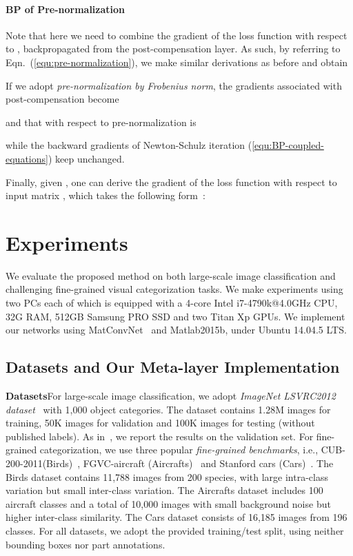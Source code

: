\documentclass[10pt,twocolumn,letterpaper]{article}
\begin{document}
\paragraph{BP of Pre-normalization} Note that here we need to combine the gradient of the loss function  with respect to , backpropagated from the post-compensation layer. As such, by referring to Eqn.~(\ref{equ:pre-normalization}), we make similar derivations as before and obtain 


If we adopt \textit{pre-normalization by Frobenius norm}, the gradients associated with post-compensation  become

and that with respect to  pre-normalization  is

while the backward gradients of Newton-Schulz iteration (\ref{equ:BP-coupled-equations}) keep unchanged.

Finally, given , one can derive the gradient of the loss function  with respect to  input matrix , which takes the following form~\cite{Li_2017_ICCV}:




\section{Experiments}\label{section:experiments}

We  evaluate the proposed method on both large-scale image classification and challenging fine-grained visual categorization  tasks. We make experiments using two PCs each of which is equipped with a 4-core Intel i7-4790k@4.0GHz CPU, 32G RAM, 512GB Samsung  PRO SSD and two Titan Xp GPUs.  We implement our networks using  MatConvNet~\cite{vedaldi15matconvnet} and Matlab2015b, under Ubuntu 14.04.5 LTS.

\subsection{Datasets and Our Meta-layer Implementation}
\vspace{4pt}\noindent\textbf{Datasets}\quad For large-scale image classification, we adopt \textit{ImageNet LSVRC2012 dataset}~\cite{imagenet_cvpr09} with 1,000 object categories.  The dataset contains  1.28M images for training, 50K images for validation  and 100K images for testing (without published labels). As in~\cite{DBLP:journals/corr/IoffeS15,He_2016_CVPR}, we report the results on the validation set. For fine-grained categorization, we use three popular \textit{fine-grained benchmarks}, i.e.,  CUB-200-2011(Birds)~\cite{Wah2011The}, FGVC-aircraft (Aircrafts)~\cite{Maji2013Fine} and Stanford cars (Cars)~\cite{Krause20133D}.  The Birds dataset contains 11,788 images from 200 species, with large intra-class variation but small inter-class variation. The Aircrafts dataset includes 100 aircraft classes and a total of 10,000 images with small background noise but higher inter-class similarity. The Cars dataset  consists of 16,185 images from 196 classes. For all datasets, we adopt the provided training/test split, using neither bounding boxes nor part annotations.
\end{document}
